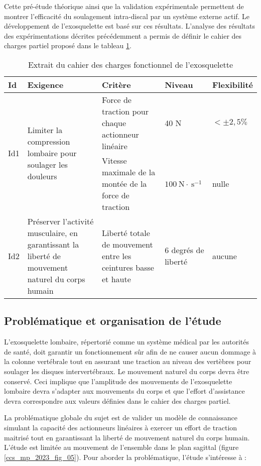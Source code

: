 Cette pré-étude théorique ainsi que la validation expérimentale permettent de montrer l'efficacité du soulagement intra-discal par un système externe actif. Le développement de l'exosquelette est basé sur ces résultats. L'analyse des résultats des expérimentations décrites précédemment a permis de définir le cahier des charges partiel proposé dans le tableau \ref{ccs_mp_2023_tab_01}.

\begin{table}[h]
\begin{center}
\begin{tabular}{lp{5cm}p{5cm}ll}
\hline
\textbf{Id} & \textbf{Exigence} & \textbf{Critère} & \textbf{Niveau} & \textbf{Flexibilité} \\
\hline
\multirow[t]{2}{*}{Id1} & \multirow[t]{2}{4cm}{Limiter la compression lombaire pour soulager les douleurs} & Force de traction pour chaque actionneur linéaire & 40 N & $< \pm 2,5 \%$ \\
 &  & Vitesse maximale de la montée de la force de traction & $100 \mathrm{~N} \cdot \mathrm{~s}^{-1}$ & nulle \\
\hline
Id2 & Préserver l'activité musculaire, en garantissant la liberté de mouvement naturel du corps humain & Liberté totale de mouvement entre les ceintures basse et haute & 6 degrés de liberté & aucune \\
\hline
\end{tabular}
\caption{Extrait du cahier des charges fonctionnel de l'exosquelette \label{ccs_mp_2023_tab_01}}
\end{center}
\end{table}

\subsection{Problématique et organisation de l'étude}
L'exosquelette lombaire, répertorié comme un système médical par les autorités de santé, doit garantir un fonctionnement sûr afin de ne causer aucun dommage à la colonne vertébrale tout en assurant une traction au niveau des vertèbres pour soulager les disques intervertébraux. Le mouvement naturel du corps devra être conservé. Ceci implique que l'amplitude des mouvements de l'exosquelette lombaire devra s'adapter aux mouvements du corps et que l'effort d'assistance devra correspondre aux valeurs définies dans le cahier des charges partiel.

La problématique globale du sujet est de valider un modèle de connaissance simulant la capacité des actionneurs linéaires à exercer un effort de traction maitrisé tout en garantissant la liberté de mouvement naturel du corps humain.\\
L'étude est limitée au mouvement de l'ensemble dans le plan sagittal (figure \ref{ccs_mp_2023_fig_05}). Pour aborder la problématique, l'étude s'intéresse à :

